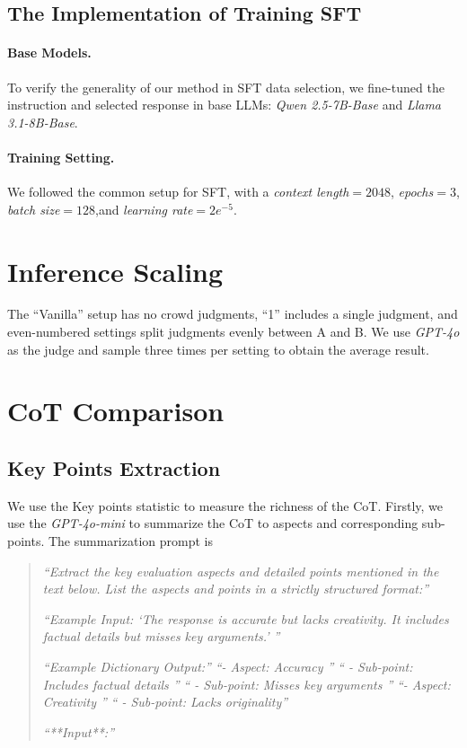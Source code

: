 \subsection{The Implementation of Training SFT}
\label{subsec:implementation_trainingsft}

\paragraph{Base Models.} To verify the generality of our method in SFT data selection, we fine-tuned the instruction and selected response in base LLMs: \textit{Qwen 2.5-7B-Base} and \textit{Llama 3.1-8B-Base}.

\paragraph{Training Setting.} We followed the common setup for SFT, with a \textit{context length}$=2048$, \textit{epochs}$=3$, \textit{batch size}$=128$,and \textit{learning rate}$=2e^{-5}$.



\section{Inference Scaling}
\label{sec:infer_scal_appendix}

The ``Vanilla'' setup has no crowd judgments, ``1'' includes a single judgment, and even-numbered settings split judgments evenly between A and B. We use \textit{GPT-4o} as the judge and sample three times per setting to obtain the average result.

\section{CoT Comparison}
\label{sec:cot_comp_appendix}
\subsection{Key Points Extraction}
We use the Key points statistic to measure the richness of the CoT. Firstly, we use the \textit{GPT-4o-mini} to summarize the CoT to aspects and corresponding sub-points. The summarization prompt is 

\begin{quote}
    \textit{``Extract the key evaluation aspects and detailed points mentioned in the text below. List the aspects and points in a strictly structured format:''}
    
    \textit{``Example Input: `The response is accurate but lacks creativity. It includes factual details but misses key arguments.' ''}
    
    \textit{``Example Dictionary Output:''}
    \textit{``- Aspect: Accuracy ''}
    \textit{``  - Sub-point: Includes factual details ''}
    \textit{``  - Sub-point: Misses key arguments ''}
    \textit{``- Aspect: Creativity ''}
    \textit{``  - Sub-point: Lacks originality''}

    \textit{``**Input**:''}
\end{quote}

